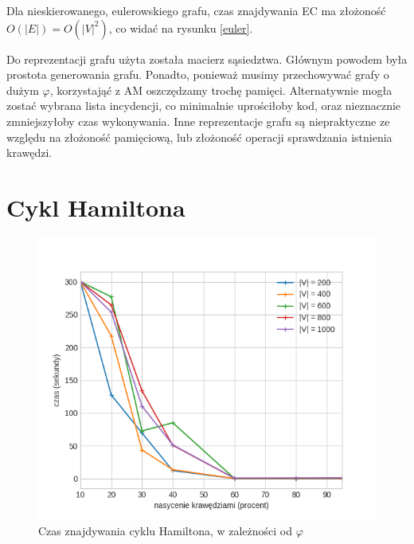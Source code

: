 \documentclass[11pt,twocolumn]{article}
\begin{document}
Dla nieskierowanego, eulerowskiego grafu, czas znajdywania EC
ma złożoność $O(|E|) = O(|V|^2)$, co widać na rysunku \ref{euler}.

Do reprezentacji grafu użyta została macierz sąsiedztwa.
Głównym powodem była prostota generowania grafu.
Ponadto, ponieważ musimy przechowywać grafy o dużym $\varphi$,
korzystająć z AM oszczędzamy trochę pamięci.
Alternatywnie mogła zostać wybrana lista incydencji, co
minimalnie uprościłoby kod,
oraz nieznacznie zmniejszyłoby czas wykonywania.
Inne reprezentacje grafu są niepraktyczne ze względu na złożoność pamięciową,
lub złożoność operacji sprawdzania istnienia krawędzi.

\section{Cykl Hamiltona}

\begin{figure}[h!]
	\includegraphics[width=\linewidth]{hamil_by_v.png}
	\caption{Czas znajdywania cyklu Hamiltona, w zależności od $\varphi$ \label{hamil_by_v}}
\end{figure}
\end{document}
